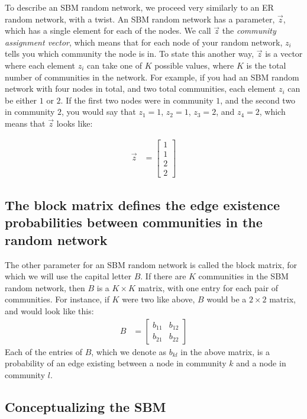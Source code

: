 To describe an SBM random network, we proceed very similarly to an ER random network, with a twist. An SBM random network has a parameter, $\vec z$, which has a single element for each of the nodes. We call $\vec z$ the \textit{community assignment vector}, which means that for each node of your random network, $z_i$ tells you which community the node is in. To state this another way, $\vec z$ is a vector where each element $z_i$ can take one of $K$ possible values, where $K$ is the total number of communities in the network. For example, if you had an SBM random network with four nodes in total, and two total communities, each element $z_i$ can be either $1$ or $2$. If the first two nodes were in community $1$, and the second two in community $2$, you would say that $z_1 = 1$, $z_2 = 1$, $z_3 = 2$, and $z_4 = 2$, which means that $\vec z$ looks like:

\begin{align*}
    \vec z &= \begin{bmatrix}1 \\ 1 \\ 2 \\ 2\end{bmatrix}
\end{align*}
\subsection{The block matrix defines the edge existence probabilities between communities in the random network}

The other parameter for an SBM random network is called the block matrix, for which we will use the capital letter $B$. If there are $K$ communities in the SBM random network, then $B$ is a $K \times K$ matrix, with one entry for each pair of communities. For instance, if $K$ were two like above, $B$ would be a $2 \times 2$ matrix, and would look like this:
\begin{align*}
    B &= \begin{bmatrix}
        b_{11} & b_{12} \\ b_{21} & b_{22}
    \end{bmatrix}
\end{align*}
Each of the entries of $B$, which we denote as $b_{kl}$ in the above matrix, is a probability of an edge existing between a node in community $k$ and a node in community $l$. 

\subsection{Conceptualizing the SBM}

